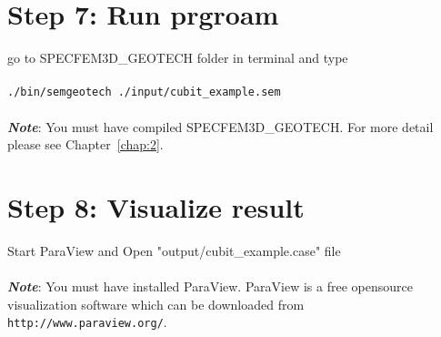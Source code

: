 \section*{Step 7: Run prgroam}

go to SPECFEM3D\_GEOTECH folder in terminal and type\\
\\
\texttt{./bin/semgeotech ./input/cubit\_example.sem}\\
\\
\textbf{\emph{Note}}: You must have compiled SPECFEM3D\_GEOTECH. For more detail please see Chapter~\ref{chap:2}.

\section*{Step 8: Visualize result}

Start ParaView and Open "output/cubit\_example.case" file\\
\\
\textbf{\emph{Note}}: You must have installed ParaView. ParaView is a free opensource visualization software which
can be downloaded from \texttt{http://www.paraview.org/}.

